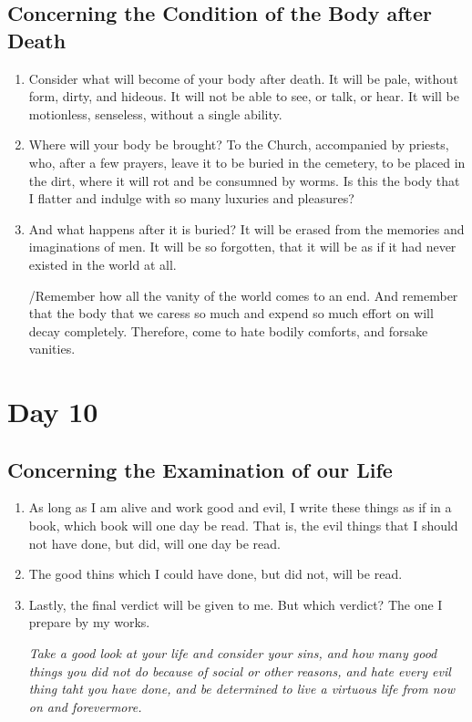 \documentclass[11pt]{article}
\begin{document}
\subsection{Concerning the Condition of the Body after Death}
\label{sec:orga68bf70}
\begin{enumerate}
\item Consider what will become of your body after death. It will be pale, without form, dirty, and hideous. It will not be able to see, or talk, or hear. It will be motionless, senseless, without a single ability.
\item Where will your body be brought? To the Church, accompanied by priests, who, after a few prayers, leave it to be buried in the cemetery, to be placed in the dirt, where it will rot and be consumned by worms.
Is this the body that I flatter and indulge with so many luxuries and pleasures?
\item And what happens after it is buried? It will be erased from the memories and imaginations of men. It will be so forgotten, that it will be as if it had never existed in the world at all.

/Remember how all the vanity of the world comes to an end. And remember that the body that we caress so much and expend so much effort on will decay completely. Therefore, come to hate bodily comforts, and forsake vanities.
\end{enumerate}
\section{Day 10}
\label{sec:orgef35194}
\subsection{Concerning the Examination of our Life}
\label{sec:orgd8eb210}
\begin{enumerate}
\item As long as I am alive and work good and evil, I write these things as if in a book, which book will one day be read. That is, the evil things that I should not have done, but did, will one day be read.
\item The good thins which I could have done, but did not, will be read.
\item Lastly, the final verdict will be given to me. But which verdict? The one I prepare by my works.

\emph{Take a good look at your life and consider your sins, and how many good things you did not do because of social or other reasons, and hate every evil thing taht you have done, and be determined to live a virtuous life from now on and forevermore.}
\end{enumerate}
\end{document}
